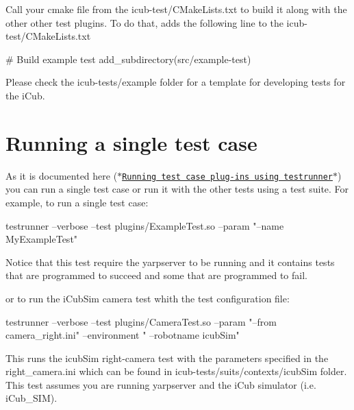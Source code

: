 Call your cmake file from the {\ttfamily icub-\/test/\-C\-Make\-Lists.\-txt} to build it along with the other other test plugins. To do that, adds the following line to the {\ttfamily icub-\/test/\-C\-Make\-Lists.\-txt}


\begin{DoxyCode}
\textcolor{preprocessor}{# Build example test }
\textcolor{preprocessor}{add\_subdirectory(src/example-test)}
\end{DoxyCode}


Please check the {\ttfamily icub-\/tests/example} folder for a template for developing tests for the i\-Cub.\hypertarget{writing-and-running_running_single_test_case}{}\section{Running a single test case}\label{writing-and-running_running_single_test_case}
As it is documented here (\href{http://robotology.github.io/robot-testing/documentation/testrunner.html}{\tt $\ast$\-Running test case plug-\/ins using testrunner$\ast$}) you can run a single test case or run it with the other tests using a test suite. For example, to run a single test case\-:


\begin{DoxyCode}
testrunner --verbose --test plugins/ExampleTest.so  --param \textcolor{stringliteral}{"--name MyExampleTest"}
\end{DoxyCode}


Notice that this test require the {\ttfamily yarpserver} to be running and it contains tests that are programmed to succeed and some that are programmed to fail.

or to run the i\-Cub\-Sim camera test whith the test configuration file\-:


\begin{DoxyCode}
testrunner --verbose --test plugins/CameraTest.so --param \textcolor{stringliteral}{"--from camera\_right.ini"} --environment \textcolor{stringliteral}{"
      --robotname icubSim"}
\end{DoxyCode}


This runs the icub\-Sim right-\/camera test with the parameters specified in the {\ttfamily right\-\_\-camera.\-ini} which can be found in {\ttfamily icub-\/tests/suits/contexts/icub\-Sim} folder. This test assumes you are running {\ttfamily yarpserver} and the i\-Cub simulator (i.\-e. {\ttfamily i\-Cub\-\_\-\-S\-I\-M}).

